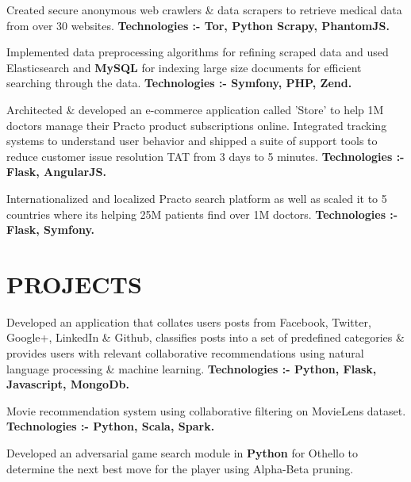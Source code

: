 \documentclass[]{deedy-resume}
\begin{document}
\begin{minipage}[t]{0.66\textwidth}
\begin{tightemize}
\item Created secure anonymous web crawlers \& data scrapers to retrieve medical data from over 30 websites. {\bf Technologies :- Tor, Python Scrapy, PhantomJS.}
\item Implemented data preprocessing algorithms for refining scraped data and used Elasticsearch and {\bf MySQL} for indexing large size documents for efficient searching through the data. {\bf Technologies :- Symfony, PHP, Zend.}
\item Architected \& developed an e-commerce application called 'Store' to help 1M doctors manage their Practo product subscriptions online. Integrated tracking systems to understand user behavior and shipped a suite of support tools to reduce customer issue resolution TAT from 3 days to 5 minutes. {\bf Technologies :- Flask, AngularJS.}
\item Internationalized and localized Practo search platform as well as scaled it to 5 countries where its helping 25M patients find over 1M doctors. {\bf Technologies :- Flask, Symfony.}
\end{tightemize}
\sectionsep


\section{PROJECTS}
\descript{}
Developed an application that collates users posts from Facebook, Twitter, Google+, LinkedIn \& Github, classifies posts into a set of predefined categories \& provides users with relevant collaborative recommendations using natural language processing \& machine learning. {\bf Technologies :- Python, Flask, Javascript, MongoDb.}
\sectionsep

\descript{}
Movie recommendation system using collaborative filtering on MovieLens dataset. {\bf Technologies :- Python, Scala, Spark.}
\sectionsep

\descript{}
Developed an adversarial game search module in {\bf Python} for Othello to determine the next best move for the player using Alpha-Beta pruning. 
\sectionsep
\end{minipage} 
\end{document}
